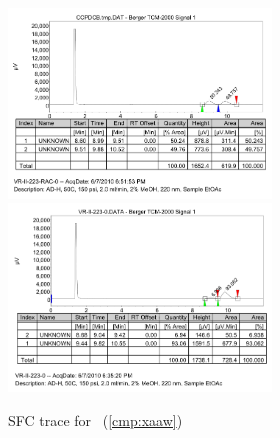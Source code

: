\begin{figure}[h]
\centering
\includegraphics[width=2.75in]{chp_asymmetric/images/sfc/xaaw-rac.png}
\includegraphics[width=2.75in]{chp_asymmetric/images/sfc/xaaw.png}
\caption{SFC trace for \CMPxaaw~(\ref{cmp:xaaw})}
\vspace{-10pt}
\end{figure}

